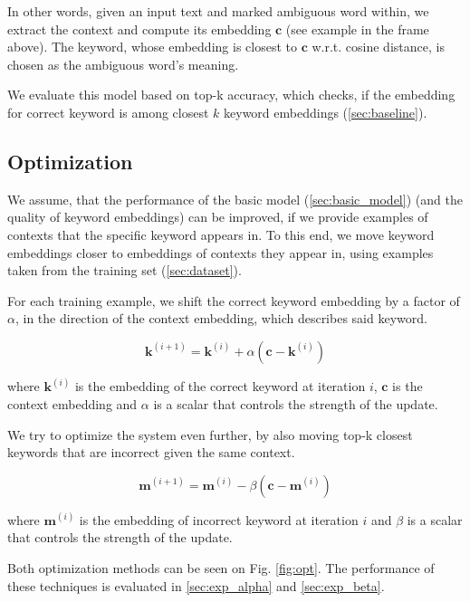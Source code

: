 \documentclass{llncs}
\begin{document}
In other words, given an input text and marked ambiguous word within, we extract the context and compute its embedding \(\bm{c}\) (see example in the frame above). The keyword, whose embedding is closest to \(\bm{c}\) w.r.t. cosine distance, is chosen as the ambiguous word's meaning.

We evaluate this model based on top-k accuracy, which checks, if the embedding for correct keyword is among closest \(k\) keyword embeddings (\ref{sec:baseline}).


\subsection{Optimization}
\label{sec:optimization}
We assume, that the performance of the basic model (\ref{sec:basic_model}) (and the quality of keyword embeddings) can be improved, if we provide examples of contexts that the specific keyword appears in. To this end, we move keyword embeddings closer to embeddings of contexts they appear in, using examples taken from the training set (\ref{sec:dataset}).

For each training example, we shift the correct keyword embedding by a factor of \(\alpha\), in the direction of the context embedding, which describes said keyword.

\begin{equation}
    \label{eq:alpha_optimization}
    \bm{k}^{(i+1)} = \bm{k}^{(i)} + \alpha(\bm{c} - \bm{k}^{(i)})
\end{equation}

where \(\bm{k}^{(i)}\) is the embedding of the correct keyword at iteration \(i\), \(\bm{c}\) is the context embedding and \(\alpha\) is a scalar that controls the strength of the update.

\smallskip
We try to optimize the system even further, by also moving top-k closest keywords that are incorrect given the same context.

\begin{equation}
    \label{eq:beta_optimization}
    \bm{m}^{(i+1)} = \bm{m}^{(i)} - \beta(\bm{c} - \bm{m}^{(i)})
\end{equation}

where \(\bm{m}^{(i)}\) is the embedding of incorrect keyword at iteration \(i\) and \(\beta\) is a scalar that controls the strength of the update.

Both optimization methods can be seen on Fig. \ref{fig:opt}. The performance of these techniques is evaluated in \ref{sec:exp_alpha} and \ref{sec:exp_beta}.
\end{document}
